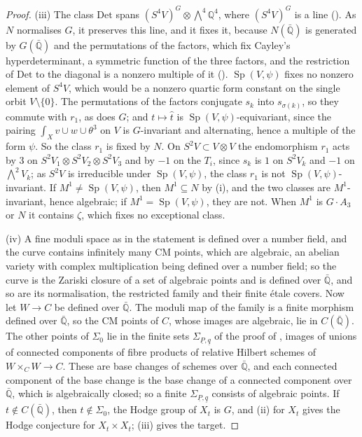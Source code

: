 \documentclass[11pt,reqno]{amsart}
\theoremstyle{plain}
\theoremstyle{definition}
\theoremstyle{remark}
\newcommand{\QQ}{\mathbb{Q}}
\DeclareMathOperator{\Sp}{Sp}
\begin{document}
\begin{proof}
(iii) The class $\mathrm{Det}$ spans $(S^{4}V)^{G}\otimes
{\textstyle\bigwedge^{4}}\QQ^{4}$, where $(S^{4}V)^{G}$ is a line
(). As $N$ normalises $G$, it preserves this line, and it
fixes it, because $N(\bar{\QQ})$ is generated by $G(\bar{\QQ})$ and the
permutations of the factors, which fix Cayley's hyperdeterminant, a
symmetric function of the three factors, and the restriction of
$\mathrm{Det}$ to the diagonal is a nonzero multiple of it
(). $\Sp(V,\psi)$
fixes no nonzero element of $S^{4}V$, which would be a nonzero quartic form
constant on the single orbit $V\setminus\{0\}$. The permutations of the
factors conjugate $s_{k}$ into $s_{\sigma(k)}$, so they commute with $r_{1}$,
as does $G$; and $t\mapsto\hat{t}$ is $\Sp(V,\psi)$-equivariant, since the
pairing $\int_{X}v\cup w\cup\theta^{3}$ on $V$ is $G$-invariant and
alternating, hence a multiple of the form $\psi$. So the class $r_{1}$ is
fixed by $N$. On $S^{2}V\subset V\otimes V$ the endomorphism $r_{1}$ acts by
$3$ on $S^{2}V_{1}\otimes S^{2}V_{2}\otimes S^{2}V_{3}$ and by $-1$ on the
$T_{i}$, since $s_{k}$ is $1$ on $S^{2}V_{k}$ and $-1$ on
${\textstyle\bigwedge^{2}}V_{k}$; as $S^{2}V$ is irreducible under
$\Sp(V,\psi)$, the class $r_{1}$ is not $\Sp(V,\psi)$-invariant. If
$M^{1}\ne\Sp(V,\psi)$, then $M^{1}\subseteq N$ by (i), and the two classes are
$M^{1}$-invariant, hence algebraic; if $M^{1}=\Sp(V,\psi)$, they are not. When
$M^{1}$ is $G\cdot A_{3}$ or $N$ it contains $\zeta$, which fixes no
exceptional class.

(iv) A fine moduli space as in the statement is defined over a number field,
and the curve contains infinitely many CM points, which are algebraic, an
abelian variety with complex multiplication being defined over a number
field; so the curve is the Zariski closure of a set of algebraic points and
is defined over $\bar{\QQ}$, and so are its normalisation, the restricted
family and their finite \'etale covers. Now let $W\to C$ be defined over
$\bar{\QQ}$. The moduli map of the family is a finite morphism defined over
$\bar{\QQ}$, so the CM points of $C$, whose images are algebraic, lie in
$C(\bar{\QQ})$. The other points of $\Sigma_{0}$ lie in the finite sets
$\Sigma_{\underline{P},\underline{q}}$ of the proof of
, images of unions of connected components of fibre
products of relative Hilbert schemes of $W\times_{C}W\to C$. These are base
changes of schemes over $\bar{\QQ}$, and each connected component of the
base change is the base change of a connected component over $\bar{\QQ}$,
which is algebraically closed; so a finite
$\Sigma_{\underline{P},\underline{q}}$ consists of algebraic points. If
$t\notin C(\bar{\QQ})$, then $t\notin\Sigma_{0}$, the Hodge group of $X_{t}$ is
$G$, and (ii) for $X_{t}$ gives the Hodge conjecture for $X_{t}\times X_{t}$;
(iii) gives the target.
\end{proof}
\end{document}
